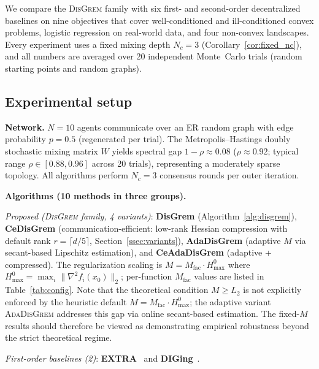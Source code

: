 \documentclass[11pt,a4paper]{article}
\begin{document}
	We compare the \textsc{DisGrem} family with six first- and
	second-order decentralized baselines on nine objectives that
	cover well-conditioned and ill-conditioned convex problems,
	logistic regression on real-world data, and four non-convex landscapes.
	Every experiment uses a fixed mixing depth $N_c{=}3$
	(Corollary~\ref{cor:fixed_nc}), and all numbers are averaged
	over 20 independent Monte~Carlo trials (random starting points
	and random graphs).
	
	\subsection{Experimental setup}\label{ssec:setup}
	
	\noindent\textbf{Network.}
	$N{=}10$ agents communicate over an ER random graph
	with edge probability $p{=}0.5$ (regenerated per trial).
	The Metropolis--Hastings doubly stochastic mixing matrix $W$ yields
	spectral gap $1{-}\rho\approx 0.08$
	($\rho\approx 0.92$; typical range $\rho\in[0.88,0.96]$ across 20 trials),
	representing a moderately sparse topology.
	All algorithms perform $N_c{=}3$ consensus rounds per outer iteration.
	
	\noindent\textbf{Algorithms (10 methods in three groups).}
	
	\noindent\textit{Proposed (\textsc{DisGrem} family, 4 variants)}:
	\textbf{DisGrem} (Algorithm~\ref{alg:disgrem}),
	\textbf{CeDisGrem} (communication-efficient: low-rank Hessian compression
	with default rank $r{=}\lceil d/5\rceil$, Section~\ref{ssec:variants}),
	\textbf{AdaDisGrem} (adaptive $M$ via secant-based Lipschitz estimation),
	and \textbf{CeAdaDisGrem} (adaptive + compressed).
	The regularization scaling is $M = M_{\mathrm{fac}}\cdot H_{\max}^{0}$ where
	$H_{\max}^{0} = \max_i \|\nabla^2 f_i(x_0)\|_2$;
	per-function $M_{\mathrm{fac}}$ values are listed in Table~\ref{tab:config}.
	Note that the theoretical condition $M\ge L_2$ is not explicitly
	enforced by the heuristic default $M=M_{\mathrm{fac}}\cdot H_{\max}^0$;
	the adaptive variant \textsc{AdaDisGrem} addresses this gap via
	online secant-based estimation.
	The fixed-$M$ results should therefore be viewed as demonstrating
	empirical robustness beyond the strict theoretical regime.
	
	\noindent\textit{First-order baselines (2)}:
	\textbf{EXTRA}~\citep{shi2015extra} and
	\textbf{DIGing}~\citep{nedic2017diging}.
	
\end{document}
